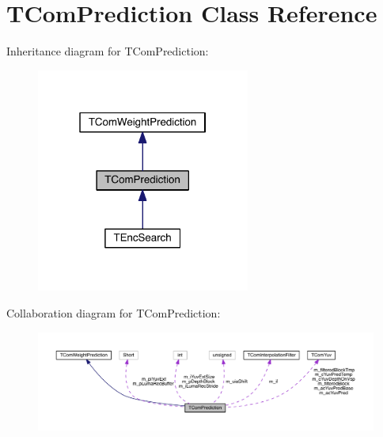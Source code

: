 \hypertarget{class_t_com_prediction}{}\section{T\+Com\+Prediction Class Reference}
\label{class_t_com_prediction}


Inheritance diagram for T\+Com\+Prediction\+:
\nopagebreak
\begin{figure}[H]
\begin{center}
\leavevmode
\includegraphics[width=199pt]{df/d6b/class_t_com_prediction__inherit__graph}
\end{center}
\end{figure}


Collaboration diagram for T\+Com\+Prediction\+:
\nopagebreak
\begin{figure}[H]
\begin{center}
\leavevmode
\includegraphics[width=350pt]{de/d4c/class_t_com_prediction__coll__graph}
\end{center}
\end{figure}
